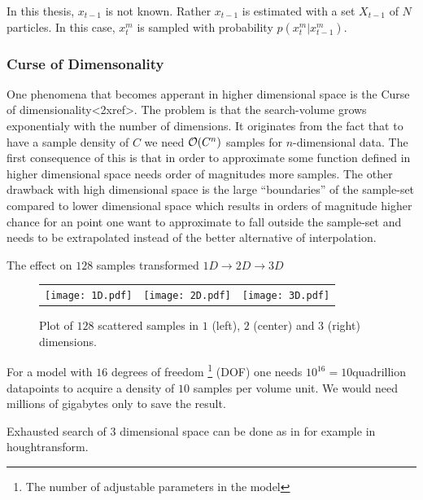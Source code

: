 In this thesis, $x_{t-1}$ is not known. Rather $x_{t-1}$ is estimated with a set $X_{t-1}$ of $N$ particles. In this case, $x_t^m$ is sampled with probability $p\left(x_t^m | x_{t-1}^m\right)$.



\subsubsection{Curse of Dimensonality}
One phenomena that becomes apperant in higher dimensional space is the Curse of dimensionality<2xref>.
The problem is that the search-volume grows exponentialy with
the number of dimensions. It originates from the fact that to have 
a sample density of $C$ we need $\mathcal{O}{\left(C^n\right)}$ samples for $n$-dimensional data.
The first consequence of this is that in order to approximate some
function defined in higher dimensional space needs order of magnitudes more samples.
The other drawback with high dimensional space is the large ``boundaries'' 
of the sample-set compared to lower dimensional space which results in orders of
magnitude higher chance for an point one want to approximate to fall outside
the sample-set and needs to be extrapolated instead of the better alternative of interpolation.


\begin{example}
The effect on $128$ samples transformed $1D\rightarrow2D\rightarrow3D$
\begin{figure}
    \begin{tabular}{rcl}
        \texttt{[image: 1D.pdf]}&
        \texttt{[image: 2D.pdf]}&
        \texttt{[image: 3D.pdf]}
    \end{tabular}
    \caption{Plot of $128$ scattered samples in $1$ (left), $2$ (center) and $3$ (right) dimensions.}
\end{figure}
\end{example}

\begin{example}
    For a model with $16$ degrees of freedom
    \footnote{The number of adjustable parameters in the model} (DOF) 
    one needs $10^16=10$quadrillion datapoints to acquire a density
    of $10$ samples per volume unit. We would need millions of gigabytes only to save the result.
\end{example}

\begin{example}
    Exhausted search of $3$ dimensional space can be done as in for example in houghtransform.
\end{example}


